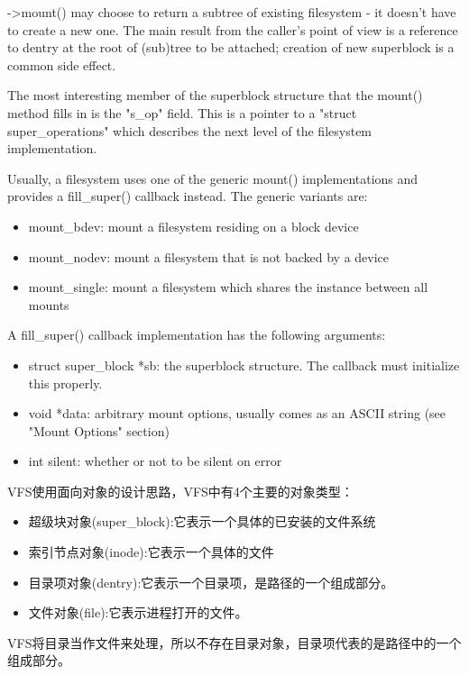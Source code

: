  ->mount() may choose to return a subtree of existing filesystem - it
 doesn't have to create a new one.  The main result from the caller's
 point of view is a reference to dentry at the root of (sub)tree to
 be attached; creation of new superblock is a common side effect.
 
 The most interesting member of the superblock structure that the
 mount() method fills in is the "s\_op" field. This is a pointer to
 a "struct super\_operations" which describes the next level of the
 filesystem implementation.
 
 Usually, a filesystem uses one of the generic mount() implementations
 and provides a fill\_super() callback instead. The generic variants are:

	\begin{itemize}
	\item   mount\_bdev: mount a filesystem residing on a block device
	\item   mount\_nodev: mount a filesystem that is not backed by a device
	\item   mount\_single: mount a filesystem which shares the instance between all mounts
	\end{itemize}
 A fill\_super() callback implementation has the following arguments:
 	\begin{itemize}
   \item struct super\_block *sb: the superblock structure. The callback
         must initialize this properly.
 
    \item void *data: arbitrary mount options, usually comes as an ASCII
         string (see "Mount Options" section)
 
    \item int silent: whether or not to be silent on error
	\end{itemize}
VFS使用面向对象的设计思路，VFS中有4个主要的对象类型：

\begin{itemize}
\item 超级块对象(super\_block):它表示一个具体的已安装的文件系统
\item 索引节点对象(inode):它表示一个具体的文件
\item 目录项对象(dentry):它表示一个目录项，是路径的一个组成部分。
\item 文件对象(file):它表示进程打开的文件。
\end{itemize}

VFS将目录当作文件来处理，所以不存在目录对象，目录项代表的是路径中的一个组成部分。


